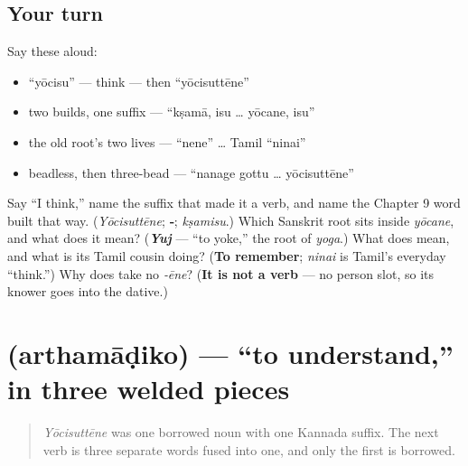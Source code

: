 \subsection*{Your turn}
Say these aloud:

\begin{itemize}
\raggedright
  \item \textquotedblleft{}yōcisu\textquotedblright{} — think — then \textquotedblleft{}yōcisuttēne\textquotedblright{}
  \item two builds, one suffix — \textquotedblleft{}kṣamā, isu … yōcane, isu\textquotedblright{}
  \item the old root's two lives — \textquotedblleft{}nene\textquotedblright{} … Tamil \textquotedblleft{}ninai\textquotedblright{}
  \item beadless, then three-bead — \textquotedblleft{}nanage gottu … yōcisuttēne\textquotedblright{}
\end{itemize}

\begin{tcolorbox}[breakable,colback=teal!4,colframe=teal!35!black,title={Before you move on}]
Say \textquotedblleft{}I think,\textquotedblright{} name the suffix that made it a verb, and name the Chapter 9 word built that way. (\emph{Yōcisuttēne}; \textbf{‑}; \emph{kṣamisu}.) Which Sanskrit root sits inside \emph{yōcane}, and what does it mean? (\emph{\textbf{Yuj}} — \textquotedblleft{}to yoke,\textquotedblright{} the root of \emph{yoga}.) What does  mean, and what is its Tamil cousin doing? (\textbf{To remember}; \emph{ninai} is Tamil's everyday \textquotedblleft{}think.\textquotedblright{}) Why does  take no \emph{‑ēne}? (\textbf{It is not a verb} — no person slot, so its knower goes into the dative.)
\end{tcolorbox}
\section[\texorpdfstring{\kn{ಅರ್ಥಮಾಡಿಕೊ} (arthamāḍiko)}{ಅರ್ಥಮಾಡಿಕೊ (arthamāḍiko)}]{ (arthamāḍiko) — \textquotedblleft{}to understand,\textquotedblright{} in three welded pieces}

\label{lesson:KA-C33-artha-maadiko}



\begin{quote}
\emph{Yōcisuttēne} was one borrowed noun with one Kannada suffix. The next verb is three separate words fused into one, and only the first is borrowed.
\end{quote}

